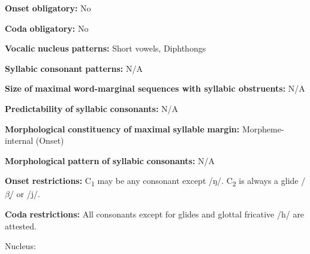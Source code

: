 \begin{styleBody}
\textbf{Onset} \textbf{obligatory:} No
\end{styleBody}

\begin{styleBody}
\textbf{Coda} \textbf{obligatory:} No
\end{styleBody}

\begin{styleBody}
\textbf{Vocalic} \textbf{nucleus} \textbf{patterns:} Short vowels, Diphthongs
\end{styleBody}

\begin{styleBody}
\textbf{Syllabic} \textbf{consonant} \textbf{patterns:} N/A
\end{styleBody}

\begin{styleBody}
\textbf{Size} \textbf{of} \textbf{maximal} \textbf{word{}-marginal sequences with syllabic obstruents:} N/A
\end{styleBody}

\begin{styleBody}
\textbf{Predictability} \textbf{of} \textbf{syllabic} \textbf{consonants:} N/A
\end{styleBody}

\begin{styleBody}
\textbf{Morphological} \textbf{constituency} \textbf{of} \textbf{maximal} \textbf{syllable} \textbf{margin:} Morpheme-internal (Onset)
\end{styleBody}

\begin{styleBody}
\textbf{Morphological} \textbf{pattern} \textbf{of} \textbf{syllabic} \textbf{consonants:} N/A
\end{styleBody}

\begin{styleBody}
\textbf{Onset} \textbf{restrictions:} C\textsubscript{1} may be any consonant except /ŋ/. C\textsubscript{2} is always a glide /$\beta ̞$/ or /j/.
\end{styleBody}

\begin{styleBody}
\textbf{Coda} \textbf{restrictions:} All consonants except for glides and glottal fricative /h/ are attested.
\end{styleBody}

\begin{styleBody}
Nucleus:
\end{styleBody}

